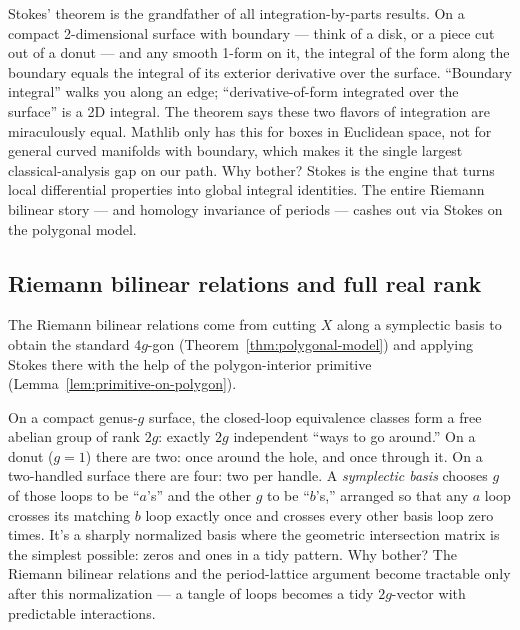 \begin{layman}
Stokes' theorem is the grandfather of all integration-by-parts results.
On a compact 2-dimensional surface with boundary --- think of a disk, or
a piece cut out of a donut --- and any smooth 1-form on it, the integral
of the form along the boundary equals the integral of its exterior
derivative over the surface. ``Boundary integral'' walks you along an
edge; ``derivative-of-form integrated over the surface'' is a 2D
integral. The theorem says these two flavors of integration are
miraculously equal. Mathlib only has this for boxes in Euclidean space,
not for general curved manifolds with boundary, which makes it the
single largest classical-analysis gap on our path. Why bother? Stokes
is the engine that turns local differential properties into global
integral identities. The entire Riemann bilinear story --- and homology
invariance of periods --- cashes out via Stokes on the polygonal model.
\end{layman}

\subsection{Riemann bilinear relations and full real rank}

The Riemann bilinear relations come from cutting \(X\) along a
symplectic basis to obtain the standard \(4g\)-gon
(Theorem~\ref{thm:polygonal-model}) and applying Stokes there with
the help of the polygon-interior primitive
(Lemma~\ref{lem:primitive-on-polygon}).



\begin{layman}
On a compact genus-\(g\) surface, the closed-loop equivalence classes
form a free abelian group of rank \(2g\): exactly \(2g\) independent
``ways to go around.'' On a donut (\(g = 1\)) there are two: once
around the hole, and once through it. On a two-handled surface there
are four: two per handle. A \emph{symplectic basis} chooses \(g\) of
those loops to be ``\(a\)'s'' and the other \(g\) to be ``\(b\)'s,''
arranged so that any \(a\) loop crosses its matching \(b\) loop exactly
once and crosses every other basis loop zero times. It's a sharply
normalized basis where the geometric intersection matrix is the
simplest possible: zeros and ones in a tidy pattern. Why bother? The
Riemann bilinear relations and the period-lattice argument become
tractable only after this normalization --- a tangle of loops
becomes a tidy \(2g\)-vector with predictable interactions.
\end{layman}


